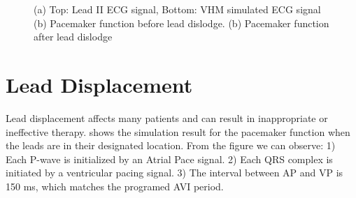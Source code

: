 \begin{figure}[t]
\centering
\vspace{-10pt}
\vspace{-5pt}
\caption{\small (a) Top: Lead II ECG signal, Bottom: VHM simulated ECG signal (b) Pacemaker function before lead dislodge. (b) Pacemaker function after lead dislodge}
\vspace{-15pt}
\end{figure} 


\section{Lead Displacement}
Lead displacement affects many patients and can result in inappropriate or ineffective therapy.  shows the simulation result for the pacemaker function when the leads are in their designated location. From the figure we can observe: 1) Each P-wave is initialized by an Atrial Pace signal. 2) Each QRS complex is initiated by a ventricular pacing signal. 3) The interval between AP and VP is 150 ms, which matches the programed AVI period.

